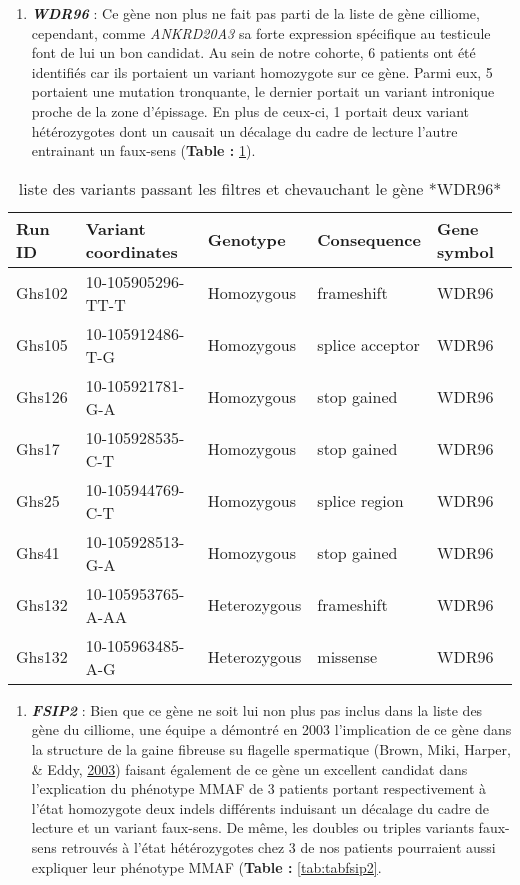 \documentclass[12pt,twoside]{reedthesis}
\providecommand{\tightlist}{%
  \setlength{\itemsep}{0pt}\setlength{\parskip}{0pt}}
\theoremstyle{definition}
\theoremstyle{definition}
\theoremstyle{remark}
\begin{document}
  \begin{enumerate}
  \def\labelenumi{\arabic{enumi}.}
  \setcounter{enumi}{5}
  \tightlist
  \item
    \textbf{\emph{WDR96}} : Ce gène non plus ne fait pas parti de la liste
    de gène cilliome, cependant, comme \emph{ANKRD20A3} sa forte
    expression spécifique au testicule font de lui un bon candidat. Au
    sein de notre cohorte, 6 patients ont été identifiés car ils portaient
    un variant homozygote sur ce gène. Parmi eux, 5 portaient une mutation
    tronquante, le dernier portait un variant intronique proche de la zone
    d'épissage. En plus de ceux-ci, 1 portait deux variant hétérozygotes
    dont un causait un décalage du cadre de lecture l'autre entrainant un
    faux-sens (\textbf{Table : }\ref{tab:tabwdr96}).
  \end{enumerate}
  
  \newpage
  
  \begin{longtable}[t]{lllll}
  \caption{\label{tab:tabwdr96}liste des variants passant les filtres et chevauchant le gène *WDR96*}\\
  \toprule
  Run ID & Variant coordinates & Genotype & Consequence & Gene symbol\\
  \midrule
  Ghs102 & 10-105905296-TT-T & Homozygous & frameshift & WDR96\\
  Ghs105 & 10-105912486-T-G & Homozygous & splice acceptor & WDR96\\
  Ghs126 & 10-105921781-G-A & Homozygous & stop gained & WDR96\\
  Ghs17 & 10-105928535-C-T & Homozygous & stop gained & WDR96\\
  Ghs25 & 10-105944769-C-T & Homozygous & splice region & WDR96\\
  \addlinespace
  Ghs41 & 10-105928513-G-A & Homozygous & stop gained & WDR96\\
  Ghs132 & 10-105953765-A-AA & Heterozygous & frameshift & WDR96\\
  Ghs132 & 10-105963485-A-G & Heterozygous & missense & WDR96\\
  \bottomrule
  \end{longtable}
  
  \begin{enumerate}
  \def\labelenumi{\arabic{enumi}.}
  \setcounter{enumi}{6}
  \tightlist
  \item
    \textbf{\emph{FSIP2}} : Bien que ce gène ne soit lui non plus pas
    inclus dans la liste des gène du cilliome, une équipe a démontré en
    2003 l'implication de ce gène dans la structure de la gaine fibreuse
    su flagelle spermatique (Brown, Miki, Harper, \& Eddy,
    \protect\hyperlink{ref-Brown2003}{2003}) faisant également de ce gène
    un excellent candidat dans l'explication du phénotype MMAF de 3
    patients portant respectivement à l'état homozygote deux indels
    différents induisant un décalage du cadre de lecture et un variant
    faux-sens. De même, les doubles ou triples variants faux-sens
    retrouvés à l'état hétérozygotes chez 3 de nos patients pourraient
    aussi expliquer leur phénotype MMAF (\textbf{Table :
    }\ref{tab:tabfsip2}.
  \end{enumerate}
  
\end{document}
